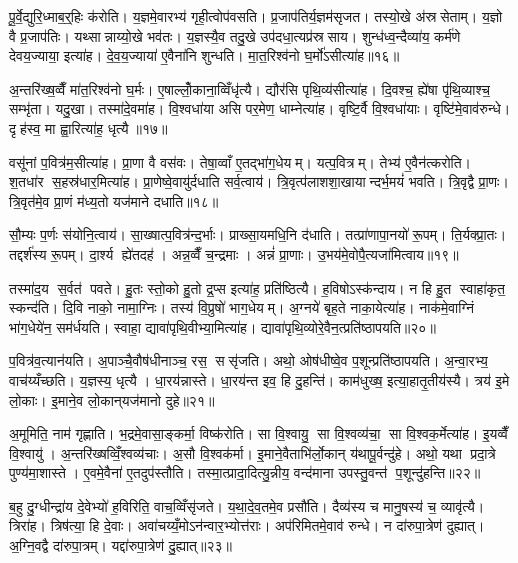 पू॒र्वे॒द्युरि॒ध्माब॒र्॒हिः क॑रोति। य॒ज्ञमे॒वारभ्य॑ गृही॒त्वोप॑वसति। प्र॒जाप॑तिर्य॒ज्ञम॑सृजत। तस्यो॒खे अ॑स्रसेताम्। य॒ज्ञो वै प्र॒जाप॑तिः। यथ्सान्नाय्यो॒खे भव॑तः। य॒ज्ञस्यै॒व तदु॒खे उप॑दधा॒त्यप्र॑स्रसाय। शुन्ध॑ध्व॒न्दैव्या॑य॒ कर्म॑णे देवय॒ज्याया॒ इत्या॑ह। दे॒व॒य॒ज्याया॑ ए॒वैना॑नि शुन्धति। मा॒त॒रिश्व॑नो घ॒र्मो॑ऽसीत्या॑ह॥१६॥

अ॒न्तरि॑ख्ष॒व्वैँ मा॑त॒रिश्व॑नो घ॒र्मः। ए॒षाल्लोँ॒काना॒व्विँधृ॑त्यै। द्यौर॑सि पृथि॒व्य॑सीत्या॑ह। दि॒वश्च॒ ह्ये॑षा पृ॑थि॒व्याश्च॒ सम्भृ॑ता। यदु॒खा। तस्मा॑दे॒वमा॑ह। वि॒श्वधा॑या असि पर॒मेण॒ धाम्नेत्या॑ह। वृष्टि॒र्वै वि॒श्वधा॑याः। वृष्टि॑मे॒वाव॑रुन्धे। दृह॑स्व॒ मा ह्वा॒रित्या॑ह॒ धृत्यै॥१७॥

वसू॑नां प॒वित्र॑म॒सीत्या॑ह। प्रा॒णा वै वस॑वः। तेषा॒व्वाँ ए॒तद्भा॑ग॒धेयम्। यत्प॒वित्रम्। तेभ्य॑ ए॒वैन॑त्करोति। श॒तधा॑र स॒हस्र॑धार॒मित्या॑ह। प्रा॒णेष्वे॒वायु॑र्दधाति सर्व॒त्वाय॑। त्रि॒वृत्प॑लाशशा॒खायान्दर्भ॒मयं॑ भवति। त्रि॒वृद्वै प्रा॒णः। त्रि॒वृत॑मे॒व प्रा॒णं म॑ध्य॒तो यज॑माने दधाति॥१८॥

सौ॒म्यः प॒र्णः स॑योनि॒त्वाय॑। सा॒ख्षात्प॒वित्र॑न्द॒र्भाः। प्राख्सा॒यमधि॒नि द॑धाति। तत्प्रा॑णापा॒नयो॑ रू॒पम्। ति॒र्यक्प्रा॒तः। तद्दर्श॑स्य रू॒पम्। दा॒र्श्य ह्ये॑तदह॑। अन्न॒व्वैँ च॒न्द्रमाः। अन्नं॑ प्रा॒णाः। उ॒भय॑मे॒वोपै॒त्यजा॑मित्वाय॥१९॥

तस्मा॑द॒य स॒र्वत॑ पवते। हु॒तः स्तो॒को हु॒तो द्र॒प्स इत्या॑ह॒ प्रति॑ष्ठित्यै। ह॒विषोऽस्क॑न्दाय। न हि हु॒त स्वाहा॑कृत॒ स्कन्द॑ति। दि॒वि नाको॒ नामा॒ग्निः। तस्य॑ वि॒प्रुषो॑ भाग॒धेयम्। अ॒ग्नये॑ बृह॒ते नाका॒येत्या॑ह। नाक॑मे॒वाग्निं भा॑ग॒धेये॑न॒ सम॑र्धयति। स्वाहा॒ द्यावा॑पृथि॒वीभ्या॒मित्या॑ह। द्यावा॑पृथि॒व्योरे॒वैन॒त्प्रति॑ष्ठापयति॥२०॥

प॒वित्र॑व॒त्यान॑यति। अ॒पाञ्चै॒वौष॑धीनाञ्च॒ रस॒ ससृ॑जति। अथो॒ ओष॑धीष्वे॒व प॒शून्प्रति॑ष्ठापयति। अ॒न्वा॒रभ्य॒ वाच॑य्यँच्छति। य॒ज्ञस्य॒ धृत्यै। धा॒रय॑न्नास्ते। धा॒रय॑न्त इव॒ हि दु॒हन्ति॑। काम॑धुख्ष॒ इत्या॒हातृ॒तीय॑स्यै। त्रय॑ इ॒मे लो॒काः। इ॒माने॒व लो॒कान्‌यज॑मानो दुहे॥२१॥

अ॒मूमिति॒ नाम॑ गृह्णाति। भ॒द्रमे॒वासा॒ङ्कर्मा॒ विष्क॑रोति। सा वि॒श्वायु॒ सा वि॒श्वव्य॑चा॒ सा वि॒श्वक॒र्मेत्या॑ह। इ॒यव्वैँ वि॒श्वायु॑। अ॒न्तरि॑ख्षव्विँ॒श्वव्य॑चाः। अ॒सौ वि॒श्वक॑र्मा। इ॒माने॒वैताभि॑र्लो॒कान्‌ य॑थापू॒र्वन्दु॑हे। अथो॒ यथा प्रदा॒त्रे पुण्य॑मा॒शास्ते। ए॒वमे॒वैना॑ ए॒तदुप॑स्तौति। तस्मा॒त्प्रादा॒दित्यु॒न्नीय॒ वन्द॑माना उपस्तु॒वन्त॑ प॒शून्दु॑हन्ति॥२२॥

ब॒हु दु॒ग्धीन्द्रा॑य दे॒वेभ्यो॑ ह॒विरिति॒ वाच॒व्विँसृ॑जते। य॒था॒दे॒व॒तमे॒व प्रसौ॑ति। दैव्य॑स्य च मानु॒षस्य॑ च॒ व्यावृ॑त्यै। त्रिरा॑ह। त्रिष॑त्या॒ हि दे॒वाः। अवा॑चय्यँ॒मोऽन॑न्वार॒भ्योत्त॑राः। अप॑रिमितमे॒वाव॑ रुन्धे। न दा॑रुपा॒त्रेण॑ दुह्यात्। अ॒ग्नि॒वद्वै दा॑रुपा॒त्रम्। यद्दा॑रुपा॒त्रेण॑ दु॒ह्यात्॥२३॥

